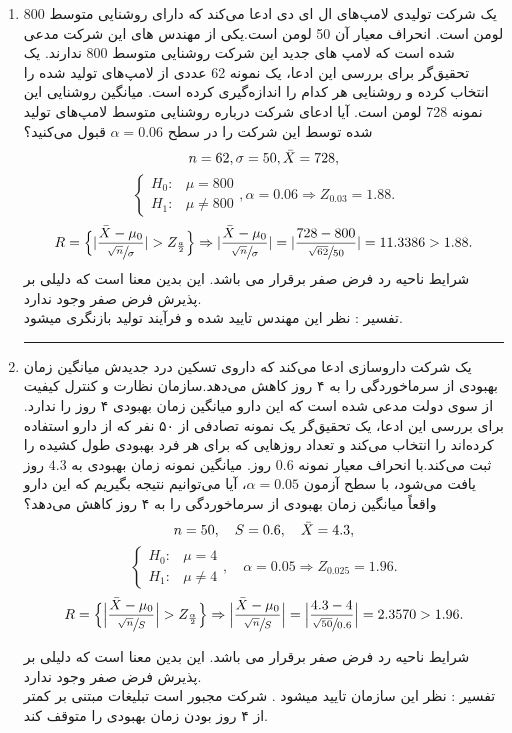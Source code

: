\documentclass{KNED}
\begin{document}
\begin{solution}

\begin{enumerate}
    \item یک شرکت تولیدی لامپ‌های ال ای دی ادعا می‌کند که دارای روشنایی متوسط 800 لومن است. انحراف معیار آن 50 لومن است.یکی از مهندس های این شرکت مدعی شده است که لامپ های جدید این شرکت روشنایی متوسط 800 ندارند. یک تحقیق‌گر برای بررسی این ادعا، یک نمونه 62 عددی از لامپ‌های تولید شده را انتخاب کرده و روشنایی هر کدام را اندازه‌گیری کرده است. میانگین روشنایی این نمونه 728 لومن است. آیا ادعای شرکت درباره روشنایی متوسط لامپ‌های تولید شده توسط این شرکت را در سطح $\alpha = 0.06$ قبول می‌کنید؟\\
    \[ n = 62,
    \sigma = 50,
    \Bar{X} = 728,
    \]
    \[
\begin{cases}
    H_0: & \mu = 800 \\
    H_1: & \mu \neq 800
\end{cases}, \alpha = 0.06 \Rightarrow Z_{0.03} = 1.88.
\]
\[
R = \Big\{  \vert \frac{\Bar{X} - \mu_0}{\sfrac{\sqrt{n}}{\sigma}}\vert  > Z_{\frac{a}{2}} \Big\} \Rightarrow \vert \frac{\Bar{X} - \mu_0}{\sfrac{\sqrt{n}}{\sigma}} \vert = \vert \frac{728 - 800}{\sfrac{\sqrt{62}}{50}} \vert = 11.3386 > 1.88.
    \]
    شرایط ناحیه رد فرض صفر برقرار می باشد. این بدین معنا است که دلیلی بر پذیرش فرض صفر
وجود ندارد.\\
تفسیر : نظر این مهندس تایید شده و فرآیند تولید بازنگری میشود.\\
\rule{\linewidth}{1pt}
\item یک شرکت داروسازی ادعا می‌کند که داروی تسکین درد جدیدش میانگین زمان بهبودی از سرماخوردگی را به ۴ روز کاهش می‌دهد.سازمان نظارت و کنترل کیفیت از سوی دولت مدعی شده است که این دارو میانگین زمان بهبودی ۴ روز را ندارد. برای بررسی این ادعا، یک تحقیق‌گر یک نمونه تصادفی از ۵۰ نفر که از دارو استفاده کرده‌اند را انتخاب می‌کند و تعداد روزهایی که برای هر فرد بهبودی طول کشیده را ثبت می‌کند.با انحراف معیار نمونه $0.6$ روز. میانگین نمونه زمان بهبودی به $4.3$ روز یافت می‌شود، با سطح آزمون $\alpha = 0.05$، آیا می‌توانیم نتیجه بگیریم که این دارو واقعاً میانگین زمان بهبودی از سرماخوردگی را به ۴ روز کاهش می‌دهد؟
\[
n = 50, \quad
S = 0.6, \quad
\Bar{X} = 4.3,
\]
\[
\begin{cases}
    H_0: & \mu = 4 \\
    H_1: & \mu \neq 4
\end{cases}, \quad
\alpha = 0.05 \Rightarrow Z_{0.025} = 1.96.
\]
\[
R = \Big\{  \Big\vert \frac{\Bar{X} - \mu_0}{\sfrac{\sqrt{n}}{S}} \Big\vert  > Z_{\frac{\alpha}{2}} \Big\} \Rightarrow \Big\vert \frac{\Bar{X} - \mu_0}{\sfrac{\sqrt{n}}{S}} \Big\vert = \Big\vert \frac{4.3 - 4}{\sfrac{\sqrt{50}}{0.6}} \Big\vert =  2.3570 > 1.96.
\]

    شرایط ناحیه رد فرض صفر برقرار می باشد. این بدین معنا است که دلیلی بر پذیرش فرض صفر
وجود ندارد.\\
تفسیر : نظر این سازمان تایید میشود . شرکت مجبور است تبلیغات مبتنی بر کمتر از ۴ روز بودن زمان بهبودی را متوقف کند.\\

\end{enumerate}
\end{solution}
\end{document}
